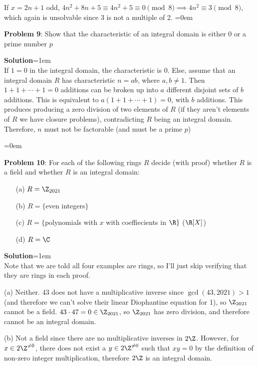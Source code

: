\documentclass{article}
\begin{document}
If $x = 2n + 1$ odd, $4n^2 + 8n + 5 \equiv 4n^2 + 5 \equiv 0 \pmod{8} \implies 4n^2 \equiv 3\pmod{8}$, which again is unsolvable since 3 is not a multiple of 2.
\newpage\parskip=0em
\begin{mdframed}[backgroundcolor=blue!20]
\textbf{Problem 9}: Show that the characteristic of an integral domain is either 0 or a prime number $p$
\end{mdframed}
\textbf{Solution}\parskip=1em\\
If $1 = 0$ in the integral domain, the characteristic is 0. Else, assume that an integral domain $R$ has characteristic $n = ab$, where $a, b \neq 1$. Then $1 + 1 + \cdots + 1 = 0$ additions can be broken up into $a$ different disjoint sets of $b$ additions. This is equivalent to $a(1 + 1 + \cdots+ 1) = 0$, with $b$ additions. This produces producing a zero division of two elements of $R$ (if they aren't elements of $R$ we have closure problems), contradicting $R$ being an integral domain. Therefore, $n$ must not be factorable (and must be a prime $p$)

\newpage\parskip=0em
\begin{mdframed}[backgroundcolor=blue!20]
\textbf{Problem 10}: For each of the following rings $R$ decide (with proof) whether $R$ is a field and whether $R$ is an integral domain:
\begin{itemize}
    \item[(a)] $R = \Z_{2021}$
    \item[(b)] $R = \{$even integers$\}$
    \item[(c)] $R = \{$polynomials with $x$ with coeffiecients in $\R\}$ ($\R[X]$)
    \item[(d)] $R = \C$
\end{itemize}
\end{mdframed}
\textbf{Solution}\parskip=1em\\
Note that we are told all four examples are rings, so I'll just skip verifying that they are rings in each proof.

(a) Neither. $43$ does not have a multiplicative inverse since $\gcd(43, 2021) > 1$ (and therefore we can't solve their linear Diophantine equation for 1), so $\Z_{2021}$ cannot be a field. $43 \cdot 47 = 0 \in \Z_{2021}$, so $\Z_{2021}$ has zero division, and therefore cannot be an integral domain.

(b) Not a field since there are no multiplicative inverses in $2\Z$. However, for $x \in 2\Z^{\neq 0}$, there does not exist a $y\in 2\Z^{\neq 0}$ such that $xy = 0$ by the definition of non-zero integer multiplication, therefore $2\Z$ is an integral domain.
\end{document}

